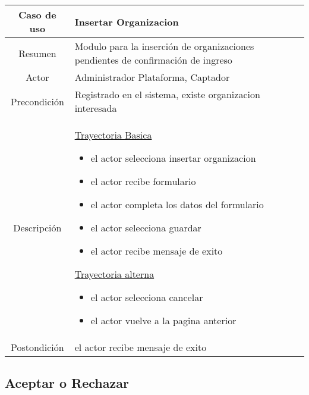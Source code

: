 \documentclass[letterpaper,openright,10pt,oneside]{report}
\begin{document}
\begin{tabular}{|c|p{110mm}|}
\hline
	Caso de uso & Insertar Organizacion\\
\hline
	Resumen & Modulo para la inserción de organizaciones pendientes de confirmación de ingreso\\
\hline
	Actor & Administrador Plataforma, Captador\\
\hline
	Precondición & Registrado en el sistema, existe organizacion interesada\\
\hline
	Descripción & 
	\underline{Trayectoria Basica}
	\begin{itemize}
		\item el actor selecciona insertar organizacion
		\item el actor recibe formulario
		\item el actor completa los datos del formulario
		\item el actor selecciona guardar
		\item el actor recibe mensaje de exito
	\end{itemize}
	\underline{Trayectoria alterna}
	\begin{itemize}
		\item el actor selecciona cancelar
		\item el actor vuelve a la pagina anterior
	\end{itemize}\\
\hline
	Postondición & el actor recibe mensaje de exito\\
\hline
\end{tabular}

\subsection{Aceptar o Rechazar}
\end{document}

